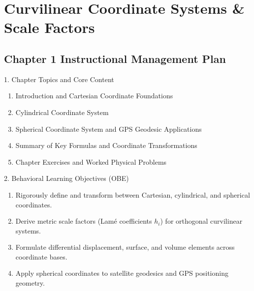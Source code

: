 \chapter{Curvilinear Coordinate Systems \& Scale Factors}

\section*{Chapter 1 Instructional Management Plan}

\begin{planbox}[colframe=rbruNavy, colbacktitle=rbruNavy]{1. Chapter Topics and Core Content}
\begin{enumerate}[topsep=2pt, itemsep=1pt, partopsep=0pt, parsep=0pt, leftmargin=1.5em]
    \item Introduction and Cartesian Coordinate Foundations
    \item Cylindrical Coordinate System
    \item Spherical Coordinate System and GPS Geodesic Applications
    \item Summary of Key Formulas and Coordinate Transformations
    \item Chapter Exercises and Worked Physical Problems
\end{enumerate}
\end{planbox}

\begin{planbox}[colframe=rbruGreen, colbacktitle=rbruGreen]{2. Behavioral Learning Objectives (OBE)}
\begin{enumerate}[topsep=2pt, itemsep=1pt, partopsep=0pt, parsep=0pt, leftmargin=1.5em]
    \item Rigorously define and transform between Cartesian, cylindrical, and spherical coordinates.
    \item Derive metric scale factors (Lamé coefficients $h_i$) for orthogonal curvilinear systems.
    \item Formulate differential displacement, surface, and volume elements across coordinate bases.
    \item Apply spherical coordinates to satellite geodesics and GPS positioning geometry.
\end{enumerate}
\end{planbox}

